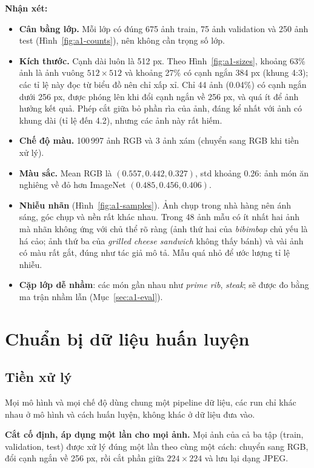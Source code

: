 \documentclass[a4paper,12pt]{article}
\begin{document}
\textbf{Nhận xét:}
\begin{itemize}
    \item \textbf{Cân bằng lớp.} Mỗi lớp có đúng 675 ảnh train, 75 ảnh validation và 250 ảnh test (Hình~\ref{fig:a1-counts}), nên không cần trọng số lớp.
    \item \textbf{Kích thước.} Cạnh dài luôn là 512 px. Theo Hình~\ref{fig:a1-sizes}, khoảng 63\% ảnh là ảnh vuông \(512\times512\) và khoảng 27\% có cạnh ngắn 384 px (khung 4:3); các tỉ lệ này đọc từ biểu đồ nên chỉ xấp xỉ. Chỉ 44 ảnh (0.04\%) có cạnh ngắn dưới 256 px, được phóng lên khi đổi cạnh ngắn về 256 px, và quá ít để ảnh hưởng kết quả. Phép cắt giữa bỏ phần rìa của ảnh, đáng kể nhất với ảnh có khung dài (tỉ lệ đến 4.2), nhưng các ảnh này rất hiếm.
    \item \textbf{Chế độ màu.} 100\,997 ảnh RGB và 3 ảnh xám (chuyển sang RGB khi tiền xử lý).
    \item \textbf{Màu sắc.} Mean RGB là \((0.557, 0.442, 0.327)\), std khoảng 0.26: ảnh món ăn nghiêng về đỏ hơn ImageNet \((0.485, 0.456, 0.406)\).
    \item \textbf{Nhiễu nhãn} (Hình~\ref{fig:a1-samples}). Ảnh chụp trong nhà hàng nên ánh sáng, góc chụp và nền rất khác nhau. Trong 48 ảnh mẫu có ít nhất hai ảnh mà nhãn không ứng với chủ thể rõ ràng (ảnh thứ hai của \emph{bibimbap} chủ yếu là há cảo; ảnh thứ ba của \emph{grilled cheese sandwich} không thấy bánh) và vài ảnh có màu rất gắt, đúng như tác giả mô tả. Mẫu quá nhỏ để ước lượng tỉ lệ nhiễu.
    \item \textbf{Cặp lớp dễ nhầm}: các món gần nhau như \emph{prime rib}, \emph{steak}; sẽ được đo bằng ma trận nhầm lẫn (Mục~\ref{sec:a1-eval}).
\end{itemize}

\FloatBarrier

\section{Chuẩn bị dữ liệu huấn luyện}\label{sec:a1-preproc}
\subsection{Tiền xử lý}
Mọi mô hình và mọi chế độ dùng chung một pipeline dữ liệu, các run chỉ khác nhau ở mô hình và cách huấn luyện, không khác ở dữ liệu đưa vào.

\textbf{Cắt cố định, áp dụng một lần cho mọi ảnh.} Mọi ảnh của cả ba tập (train, validation, test) được xử lý đúng một lần theo cùng một cách: chuyển sang RGB, đổi cạnh ngắn về 256 px, rồi cắt phần giữa \(224\times224\) và lưu lại dạng JPEG.
\end{document}
